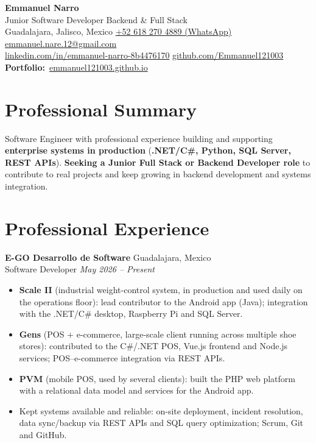 \documentclass[10pt,a4paper]{article}
\newcommand{\entry}[4]{%
  \textbf{#1} \hfill {\color{muted}\small #2}\\[0pt]
  {\color{accent}\small #3} \hfill {\color{muted}\itshape\small #4}\\[1pt]
}
\begin{document}
\begin{center}
  {\color{ink}\LARGE\bfseries Emmanuel Narro}\\[2pt]
  {\color{accent} Junior Software Developer \textbar{} Backend \& Full Stack}\\[3pt]
  {\color{muted}\small
   Guadalajara, Jalisco, Mexico \enspace\textbullet\enspace
   \href{https://wa.me/526182704889}{+52 618 270 4889 (WhatsApp)} \enspace\textbullet\enspace
   \href{mailto:emmanuel.nare.12@gmail.com}{emmanuel.nare.12@gmail.com}\\[1pt]
   \href{https://www.linkedin.com/in/emmanuel-narro-8b4476170}{linkedin.com/in/emmanuel-narro-8b4476170}
   \enspace\textbullet\enspace
   \href{https://github.com/Emmanuel121003}{github.com/Emmanuel121003}
   \enspace\textbullet\enspace
   {\color{accent}\textbf{Portfolio:}}~\href{https://emmanuel121003.github.io/}{emmanuel121003.github.io}}
\end{center}

\section{Professional Summary}
Software Engineer with professional experience building and supporting \textbf{enterprise systems in production}
(\textbf{.NET/C\#, Python, SQL Server, REST APIs}). \textbf{Seeking a Junior Full Stack or Backend Developer role} to
contribute to real projects and keep growing in backend development and systems integration.

\section{Professional Experience}

\entry{E-GO Desarrollo de Software}{Guadalajara, Mexico}{Software Developer}{May 2026 -- Present}
\begin{itemize}
  \item \textbf{Scale II} (industrial weight-control system, in production and used daily on the operations floor): lead contributor to the Android app (Java); integration with the .NET/C\# desktop, Raspberry Pi and SQL Server.
  \item \textbf{Gens} (POS + e-commerce, large-scale client running across multiple shoe stores): contributed to the C\#/.NET POS, Vue.js frontend and Node.js services; POS--e-commerce integration via REST APIs.
  \item \textbf{PVM} (mobile POS, used by several clients): built the PHP web platform with a relational data model and services for the Android app.
  \item Kept systems available and reliable: on-site deployment, incident resolution, data sync/backup via REST APIs and SQL query optimization; Scrum, Git and GitHub.
\end{itemize}
\end{document}
